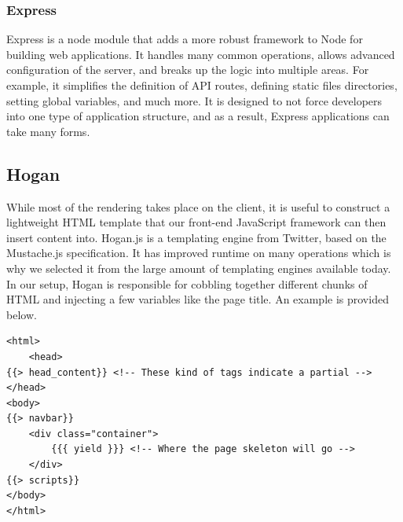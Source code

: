 \documentclass[12pt]{article}
\begin{document}
\subsubsection{Express}\label{sec:express}
Express\cite{Express} is a node module that adds a more robust framework to Node for building web applications. It handles many common operations, allows advanced configuration of the server, and breaks up the logic into multiple areas.  For example, it simplifies the definition of API routes, defining static files directories, setting global variables, and much more. It is designed to not force developers into one type of application structure, and as a result, Express applications can take many forms.

\subsection{Hogan}\label{sec:hogan}
While most of the rendering takes place on the client, it is useful to construct a lightweight HTML template that our front-end JavaScript framework can then insert content into. Hogan.js\cite{Hogan} is a templating engine from Twitter, based on the Mustache.js specification. It has improved runtime on many operations which is why we selected it from the large amount of templating engines available today. In our setup, Hogan is responsible for cobbling together different chunks of HTML and injecting a few variables like the page title. An example is provided below.
\begin{verbatim}
<html>
	<head>
{{> head_content}} <!-- These kind of tags indicate a partial -->
</head>
<body>
{{> navbar}} 
    <div class="container">
        {{{ yield }}} <!-- Where the page skeleton will go -->
    </div>
{{> scripts}}
</body>
</html>
\end{verbatim}
\end{document}
